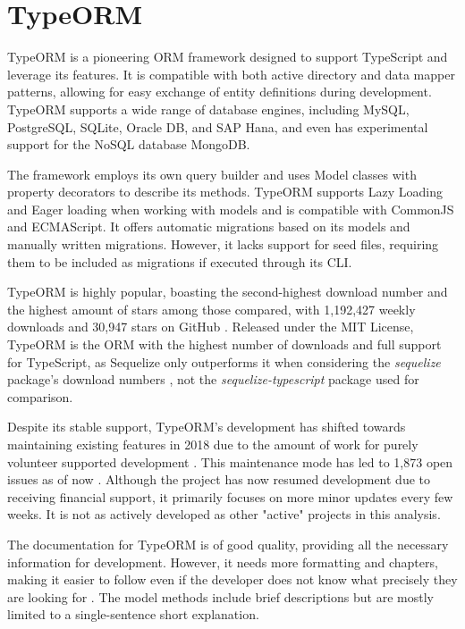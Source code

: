 \section{TypeORM}

TypeORM is a pioneering ORM framework designed to support TypeScript and
leverage its features. It is compatible with both active directory and data
mapper patterns, allowing for easy exchange of entity definitions during
development. TypeORM supports a wide range of database engines, including MySQL,
PostgreSQL, SQLite, Oracle DB, and SAP Hana, and even has experimental support
for the NoSQL database MongoDB.

The framework employs its own query builder and uses Model classes with property
decorators to describe its methods. TypeORM supports Lazy Loading and Eager
loading when working with models and is compatible with CommonJS and ECMAScript.
It offers automatic migrations based on its models and manually written
migrations. However, it lacks support for seed files, requiring them to be
included as migrations if executed through its CLI.

TypeORM is highly popular, boasting the second-highest download number and the
highest amount of stars among those compared, with 1,192,427 weekly downloads
\cite{typeORMNpm} and 30,947 stars on GitHub \cite{typeORMGitHub}. Released
under the MIT License, TypeORM is the ORM with the highest number of downloads
and full support for TypeScript, as Sequelize only outperforms it when
considering the \textit{sequelize} package's download numbers
\cite{sequelizeNpm}, not the \textit{sequelize-typescript} package
\cite{sequelizeTypescriptNpm} used for comparison.

Despite its stable support, TypeORM's development has shifted towards
maintaining existing features in 2018 due to the amount of work for purely
volunteer supported development \cite{typeORMGitHubFuture}. This maintenance
mode has led to 1,873 open issues as of now \cite{typeORMGitHub}. Although the
project has now resumed development due to receiving financial support, it
primarily focuses on more minor updates every few weeks. It is not as actively
developed as other "active" projects in this analysis.

The documentation for TypeORM is of good quality, providing all the necessary
information for development. However, it needs more formatting and chapters,
making it easier to follow even if the developer does not know what precisely
they are looking for \cite{typeORMDocs}. The model methods include brief
descriptions but are mostly limited to a single-sentence short explanation.

